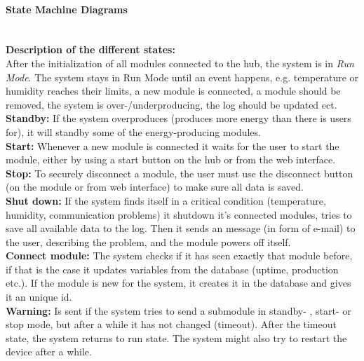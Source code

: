 			\paragraph{State Machine Diagrams}
				\textbf{ }\\
				\textbf{Description of the different states: }
				\\ After the initialization of all modules connected to the hub, the system is in  \textit{Run Mode}.
				The system stays in Run Mode until an event happens, e.g. temperature or humidity reaches their limits,
				a new module is connected, a module should be removed, the system is over-/underproducing, the log should be updated ect. 
				\\\textbf{Standby: }If the system overproduces (produces more energy than there is users for), it will standby some of the energy-producing modules.
				\\\textbf{Start: }Whenever a new module is connected it waits for the user to start the module, either by using a start button on the hub or from the web interface.
				\\\textbf{Stop: }To securely disconnect a module, the user must use the disconnect button (on the module or from web interface) to make sure all data is saved.
				\\\textbf{Shut down: }If the system finds itself in a critical condition (temperature, humidity, communication problems) it shutdown it's connected modules,
							        tries to save all available data to the log. Then it sends an message (in form of e-mail) to the user, describing the problem, and the module
							        powers off itself. 
				\\\textbf{Connect module: } The system checks if it has seen exactly that module before, if that is the case it updates variables from the database
									(uptime, production etc.). If the module is new for the system, it creates it in the database and gives it an unique id.
				\\\textbf{Warning: }Is sent if the system tries to send a submodule in standby- , start- or stop mode, but after a while it has not changed (timeout). 
							    After the timeout state, the system returns to run state. The system might also try to restart the device after a while.
